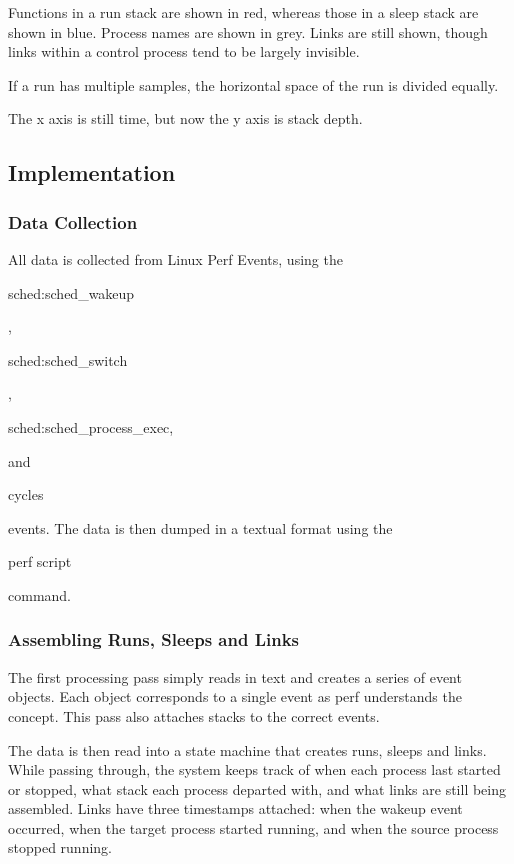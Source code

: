 \documentclass[10pt]{article}
\begin{document}
Functions in a run stack are shown in red, whereas those in a sleep stack are shown in blue.  Process names are shown in grey.  Links are still shown, though links within a control process tend to be largely invisible.

If a run has multiple samples, the horizontal space of the run is divided equally.

The x axis is still time, but now the y axis is stack depth.

\subsection{Implementation}
\subsubsection{Data Collection}


All data is collected from Linux Perf Events, using the \\ \begin{tt}sched:sched\_wakeup\end{tt}, \begin{tt}sched:sched\_switch\end{tt}, \\ \begin{tt}sched:sched\_process\_exec,\end{tt} and \begin{tt}cycles\end{tt} events.  The data is then dumped in a textual format using the \begin{tt}perf script\end{tt} command.


\subsubsection{Assembling Runs, Sleeps and Links}

The first processing pass simply reads in text and creates a series of event objects.  Each object corresponds to a single event as perf understands the concept.  This pass also attaches stacks to the correct events.

The data is then read into a  state machine that creates runs, sleeps and links.  While passing through, the system keeps track of when each process last started or stopped, what stack each process departed with, and what links are still being assembled.  Links have three timestamps attached: when the wakeup event occurred, when the target process started running, and when the source process stopped running.
\end{document}
